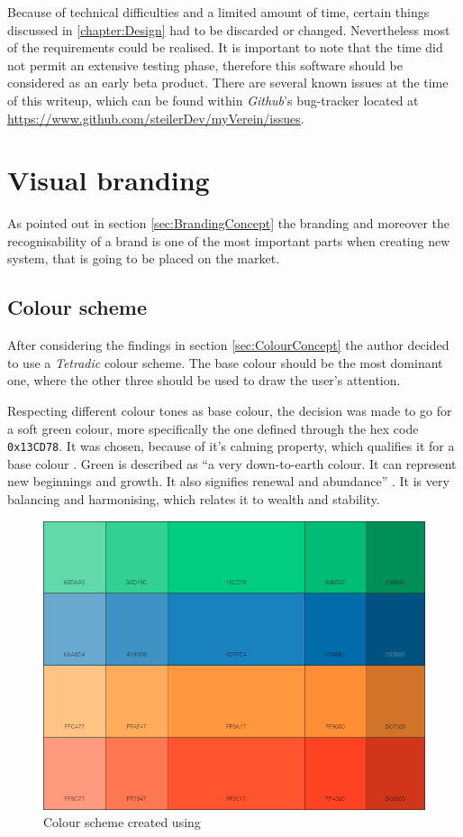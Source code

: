 Because of technical difficulties and a limited amount of time, certain things discussed in \vref{chapter:Design} had to be discarded or changed. Nevertheless most of the requirements could be realised. It is important to note that the time did not permit an extensive testing phase, therefore this software should be considered as an early beta product. There are several known issues at the time of this writeup, which can be found within \emph{Github}'s bug-tracker located at \url{https://www.github.com/steilerDev/myVerein/issues}.

\section{Visual branding}
\label{sec:BrandingImplementation}
As pointed out in section \vref{sec:BrandingConcept} the branding and moreover the recognisability of a brand is one of the most important parts when creating new system, that is going to be placed on the market. 

\subsection{Colour scheme}
After considering the findings in section \vref{sec:ColourConcept} the author decided to use a \emph{Tetradic} colour scheme. The base colour should be the most dominant one, where the other three should be used to draw the user's attention. 

Respecting different colour tones as base colour, the decision was made to go for a soft green colour, more specifically the one defined through the hex code \texttt{0x13CD78}. It was chosen, because of it's calming property, which qualifies it for a base colour \cite{Chapman:2010aa}. Green is described as \enquote{a very down-to-earth colour. It can represent new beginnings and growth. It also signifies renewal and abundance} \cite{Chapman:2010aa}. It is very balancing and harmonising, which relates it to wealth and stability. 

\begin{figure}[h]
  	\centering
  	\includegraphics[width=0.70\linewidth]{./images/color-palette.png}
  	\caption{Colour scheme created using \cite{Paletton:2015aa}}
	\label{fig:ColourScheme}
\end{figure}

